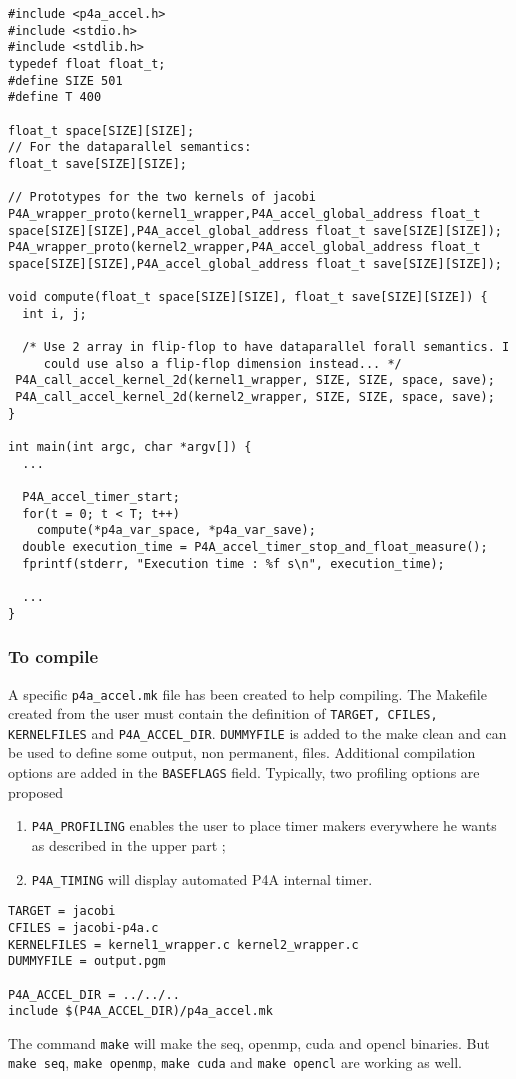 \documentclass[a4paper]{article}
\begin{document}
\begin{lstlisting}
#include <p4a_accel.h>
#include <stdio.h>
#include <stdlib.h>
typedef float float_t;
#define SIZE 501
#define T 400

float_t space[SIZE][SIZE];
// For the dataparallel semantics:
float_t save[SIZE][SIZE];

// Prototypes for the two kernels of jacobi
P4A_wrapper_proto(kernel1_wrapper,P4A_accel_global_address float_t space[SIZE][SIZE],P4A_accel_global_address float_t save[SIZE][SIZE]);
P4A_wrapper_proto(kernel2_wrapper,P4A_accel_global_address float_t space[SIZE][SIZE],P4A_accel_global_address float_t save[SIZE][SIZE]);

void compute(float_t space[SIZE][SIZE], float_t save[SIZE][SIZE]) {
  int i, j;

  /* Use 2 array in flip-flop to have dataparallel forall semantics. I
     could use also a flip-flop dimension instead... */
 P4A_call_accel_kernel_2d(kernel1_wrapper, SIZE, SIZE, space, save);
 P4A_call_accel_kernel_2d(kernel2_wrapper, SIZE, SIZE, space, save);
}

int main(int argc, char *argv[]) {
  ...

  P4A_accel_timer_start;
  for(t = 0; t < T; t++)
    compute(*p4a_var_space, *p4a_var_save);
  double execution_time = P4A_accel_timer_stop_and_float_measure();
  fprintf(stderr, "Execution time : %f s\n", execution_time);

  ...
}

\end{lstlisting}

\subsubsection{To compile}

A specific \texttt{p4a\_accel.mk} file has been created to help
compiling. The Makefile created from the user must contain the
definition of \texttt{TARGET, CFILES, KERNELFILES} and
\texttt{P4A\_ACCEL\_DIR}.  \texttt{DUMMYFILE} is added to the make
clean and can be used to define some output, non permanent, files.
Additional compilation options are added in the \texttt{BASEFLAGS}
field. Typically, two profiling options are proposed

\begin{enumerate}
\item \texttt{P4A\_PROFILING} enables the user to place timer makers everywhere he wants as described in the upper part ;
\item \texttt{P4A\_TIMING} will display automated P4A internal timer.
\end{enumerate}

\begin{lstlisting}
TARGET = jacobi
CFILES = jacobi-p4a.c
KERNELFILES = kernel1_wrapper.c kernel2_wrapper.c
DUMMYFILE = output.pgm

P4A_ACCEL_DIR = ../../..
include $(P4A_ACCEL_DIR)/p4a_accel.mk
\end{lstlisting}

The command \texttt{make} will make the seq, openmp, cuda and opencl binaries.
But \texttt{make seq}, \texttt{make openmp}, \texttt{make cuda} and \texttt{make opencl} are working as well.
\end{document}
